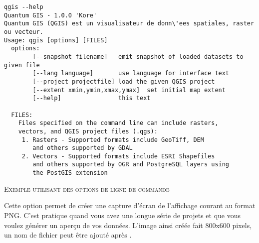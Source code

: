 \small
\begin{verbatim}
qgis --help
Quantum GIS - 1.0.0 'Kore'
Quantum GIS (QGIS) est un visualisateur de donn\'ees spatiales, raster ou vecteur.
Usage: qgis [options] [FILES]
  options:
        [--snapshot filename]   emit snapshot of loaded datasets to given file
        [--lang language]       use language for interface text
        [--project projectfile] load the given QGIS project
        [--extent xmin,ymin,xmax,ymax]  set initial map extent
        [--help]                this text

  FILES:
    Files specified on the command line can include rasters,
    vectors, and QGIS project files (.qgs):
     1. Rasters - Supported formats include GeoTiff, DEM
        and others supported by GDAL
     2. Vectors - Supported formats include ESRI Shapefiles
        and others supported by OGR and PostgreSQL layers using
        the PostGIS extension
\end{verbatim}
\normalsize


\begin{Astuce} \caption{\textsc{Exemple utilisant des options de ligne de commande}}
\end{Astuce}

%

Cette option permet de cr\'eer une capture d'\'ecran de l'affichage courant au format PNG. C'est pratique quand vous avez une longue s\'erie de projets et que vous voulez g\'en\'erer un aper\c{c}u de vos donn\'ees. L'image ainsi cr\'e\'ee fait 800x600 pixels, un nom de fichier peut \^etre ajout\'e apr\`es .

